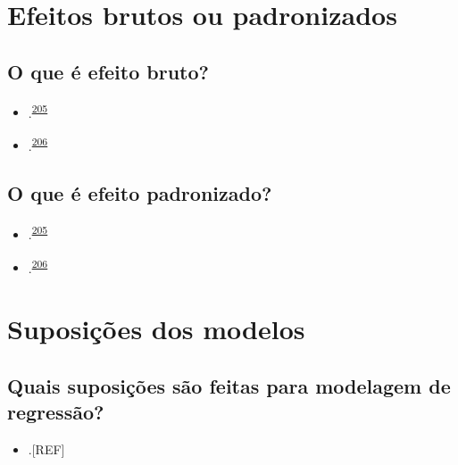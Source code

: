 \documentclass[
  a4paper,
]{book}
\providecommand{\tightlist}{%
  \setlength{\itemsep}{0pt}\setlength{\parskip}{0pt}}
\begin{document}
\hypertarget{suposicoes-modelos}{%
\section{Efeitos brutos ou padronizados}\label{suposicoes-modelos}}

\hypertarget{o-que-uxe9-efeito-bruto}{%
\subsection{O que é efeito bruto?}\label{o-que-uxe9-efeito-bruto}}

\begin{itemize}
\item
  .\textsuperscript{\protect\hyperlink{ref-greenland1986}{205}}
\item
  .\textsuperscript{\protect\hyperlink{ref-greenland1991}{206}}
\end{itemize}

\hypertarget{o-que-uxe9-efeito-padronizado}{%
\subsection{O que é efeito padronizado?}\label{o-que-uxe9-efeito-padronizado}}

\begin{itemize}
\item
  .\textsuperscript{\protect\hyperlink{ref-greenland1986}{205}}
\item
  .\textsuperscript{\protect\hyperlink{ref-greenland1991}{206}}
\end{itemize}

\hypertarget{suposiuxe7uxf5es-dos-modelos}{%
\section{Suposições dos modelos}\label{suposiuxe7uxf5es-dos-modelos}}

\hypertarget{quais-suposiuxe7uxf5es-suxe3o-feitas-para-modelagem-de-regressuxe3o}{%
\subsection{Quais suposições são feitas para modelagem de regressão?}\label{quais-suposiuxe7uxf5es-suxe3o-feitas-para-modelagem-de-regressuxe3o}}

\begin{itemize}
\tightlist
\item
  .{[}REF{]}
\end{itemize}
\end{document}

